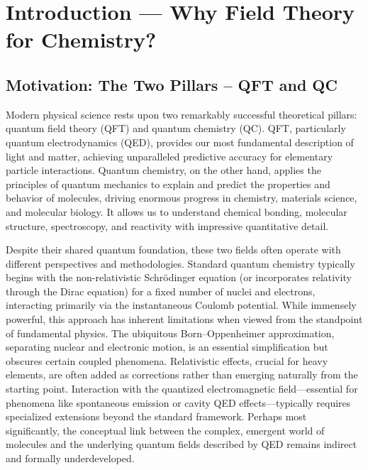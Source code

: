 
\chapter{Introduction — Why Field Theory for Chemistry?}
\label{chap:introduction}

\section{Motivation: The Two Pillars – QFT and QC}
\label{sec:intro_motivation}

Modern physical science rests upon two remarkably successful theoretical pillars: quantum field theory (QFT) and quantum chemistry (QC). QFT, particularly quantum electrodynamics (QED), provides our most fundamental description of light and matter, achieving unparalleled predictive accuracy for elementary particle interactions. Quantum chemistry, on the other hand, applies the principles of quantum mechanics to explain and predict the properties and behavior of molecules, driving enormous progress in chemistry, materials science, and molecular biology. It allows us to understand chemical bonding, molecular structure, spectroscopy, and reactivity with impressive quantitative detail.

Despite their shared quantum foundation, these two fields often operate with different perspectives and methodologies. Standard quantum chemistry typically begins with the non-relativistic Schrödinger equation (or incorporates relativity through the Dirac equation) for a fixed number of nuclei and electrons, interacting primarily via the instantaneous Coulomb potential. While immensely powerful, this approach has inherent limitations when viewed from the standpoint of fundamental physics. The ubiquitous Born--Oppenheimer approximation, separating nuclear and electronic motion, is an essential simplification but obscures certain coupled phenomena. Relativistic effects, crucial for heavy elements, are often added as corrections rather than emerging naturally from the starting point. Interaction with the quantized electromagnetic field—essential for phenomena like spontaneous emission or cavity QED effects—typically requires specialized extensions beyond the standard framework. Perhaps most significantly, the conceptual link between the complex, emergent world of molecules and the underlying quantum fields described by QED remains indirect and formally underdeveloped.

